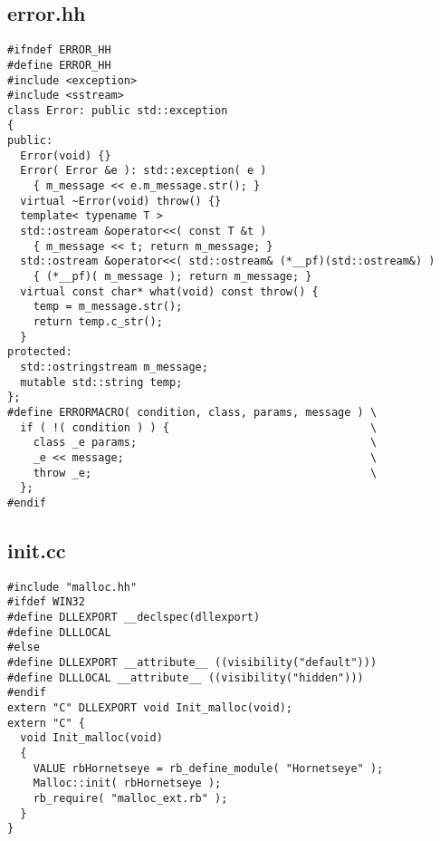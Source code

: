 \subsection{error.hh}\label{cha:error-hh}
\begin{lstlisting}
#ifndef ERROR_HH
#define ERROR_HH
#include <exception>
#include <sstream>
class Error: public std::exception
{
public:
  Error(void) {}
  Error( Error &e ): std::exception( e )
    { m_message << e.m_message.str(); }
  virtual ~Error(void) throw() {}
  template< typename T >
  std::ostream &operator<<( const T &t )
    { m_message << t; return m_message; }
  std::ostream &operator<<( std::ostream& (*__pf)(std::ostream&) )
    { (*__pf)( m_message ); return m_message; }
  virtual const char* what(void) const throw() {
    temp = m_message.str();
    return temp.c_str();
  }
protected:
  std::ostringstream m_message;
  mutable std::string temp;
};
#define ERRORMACRO( condition, class, params, message ) \
  if ( !( condition ) ) {                               \
    class _e params;                                    \
    _e << message;                                      \
    throw _e;                                           \
  };
#endif
\end{lstlisting}
\subsection{init.cc}\label{cha:init-cc}
\begin{lstlisting}
#include "malloc.hh"
#ifdef WIN32
#define DLLEXPORT __declspec(dllexport)
#define DLLLOCAL
#else
#define DLLEXPORT __attribute__ ((visibility("default")))
#define DLLLOCAL __attribute__ ((visibility("hidden")))
#endif
extern "C" DLLEXPORT void Init_malloc(void);
extern "C" {
  void Init_malloc(void)
  {
    VALUE rbHornetseye = rb_define_module( "Hornetseye" );
    Malloc::init( rbHornetseye );
    rb_require( "malloc_ext.rb" );
  }
}
\end{lstlisting}
